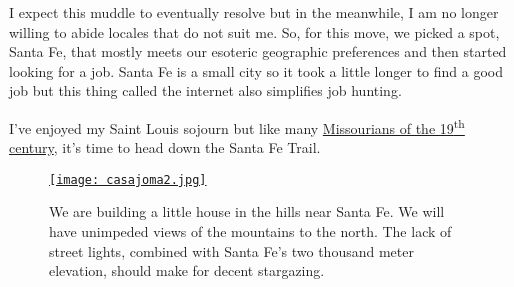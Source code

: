 I expect this muddle to eventually resolve but in the meanwhile, I am no
longer willing to abide locales that do not suit me. So, for this move,
we picked a spot, Santa Fe, that mostly meets our esoteric geographic
preferences and then started looking for a job. Santa Fe is a small city
so it took a little longer to find a good job but this thing called the
internet also simplifies job hunting.

I've enjoyed my Saint Louis sojourn but like many
\href{https://earthstonestation.com/2012/08/30/santa-fe-trail-diary-of-susan-magoffin/}{Missourians
of the 19\textsuperscript{th} century}, it's time to head down the Santa
Fe Trail.

\begin{SCfigure}
\centering
\href{https://bakerjd99.wordpress.com/casajoma2/}{\texttt{[image: casajoma2.jpg]}}
\caption[We are building a little house in the hills near Santa Fe]{We are building a little house in the hills near Santa Fe. We will have
unimpeded views of the mountains to the north. The lack of street
lights, combined with Santa Fe's two thousand meter elevation, should make for
decent stargazing.}
\label{fig:5241X0}
\end{SCfigure}




%
%



%